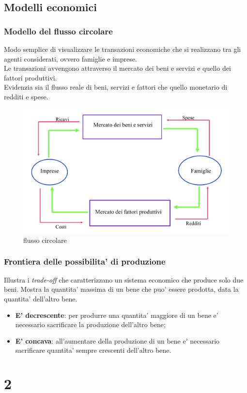\documentclass{report}
\begin{document}
	\section{Modelli economici}
	\subsection{Modello del flusso circolare}
	Modo semplice di visualizzare le transazioni economiche che si realizzano tra gli agenti considerati, ovvero famiglie e imprese.\medskip \\Le transazioni avvengono attraverso il mercato dei beni e servizi e quello dei fattori produttivi.\medskip \\Evidenzia sia il flusso reale di beni, servizi e fattori che quello monetario di redditi e spese.
	\begin{figure}[h]
		\centering
		\includegraphics[width=0.7\linewidth]{flusso-circolare}
		\caption{flusso circolare}
		\label{fig:flusso-circolare}
	\end{figure}
	\subsection{Frontiera delle possibilita' di produzione}
	Illustra i \textit{trade-off} che caratterizzano un sistema economico che produce solo due beni. Mostra la quantita' massima di un bene che puo' essere prodotta, data la quantita' dell'altro bene.
	\begin{itemize}
		\item \textbf{E' decrescente}: per produrre una quantita' maggiore di un bene e' necessario sacrificare la produzione dell'altro bene;
		\item \textbf{E' concava}: all'aumentare della produzione di un bene e' necessario sacrificare quantita' sempre crescenti dell'altro bene.
	\end{itemize}
	\chapter{2}
	
\end{document}
